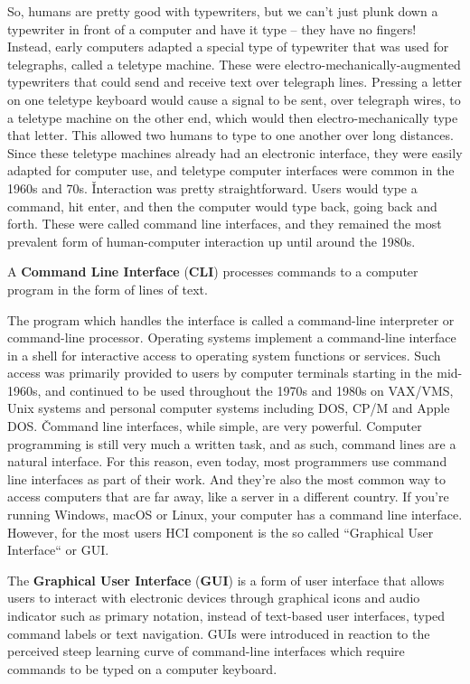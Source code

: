 So, humans are pretty good with typewriters, but we can't just plunk down a typewriter in front of a computer and
have it type – they have no fingers! Instead, early computers adapted a special type of typewriter that was used for
telegraphs, called a teletype machine. These were electro-mechanically-augmented typewriters that could send and
receive text over telegraph lines. Pressing a letter on one teletype keyboard would cause a signal to be sent, over
telegraph wires, to a teletype machine on the other end, which would then electro-mechanically type that letter. This
allowed two humans to type to one another over long distances. Since these teletype machines already had an
electronic interface, they were easily adapted for computer use, and teletype computer interfaces were common in the
1960s and 70s. \v

Interaction was pretty straightforward. Users would type a command, hit enter, and then the computer would type back,
going back and forth. These were called command line interfaces, and they remained the most prevalent form of
human-computer interaction up until around the 1980s.

A \textbf{Command Line Interface} (\textbf{CLI}) processes commands to a computer program in the form of lines of text.
\ed

The program which handles the interface is called a command-line interpreter or command-line processor. Operating
systems implement a command-line interface in a shell for interactive access to operating system functions or
services. Such access was primarily provided to users by computer terminals starting in the mid-1960s, and continued
to be used throughout the 1970s and 1980s on VAX/VMS, Unix systems and personal computer systems including DOS, CP/M
and Apple DOS. \v

Command line interfaces, while simple, are very powerful. Computer programming is still very much a written task, and
as such, command lines are a natural interface. For this reason, even today, most programmers use command line
interfaces as part of their work. And they're also the most common way to access computers that are far away, like a
server in a different country. If you're running Windows, macOS or Linux, your computer has a command line interface.
However, for the most users HCI component is the so called ``Graphical User Interface`` or GUI\@.

The \textbf{Graphical User Interface} (\textbf{GUI}) is a form of user interface that allows users to interact with
electronic devices through graphical icons and audio indicator such as primary notation, instead of text-based user
interfaces, typed command labels or text navigation. GUIs were introduced in reaction to the perceived steep learning
curve of command-line interfaces which require commands to be typed on a computer keyboard.
\ed

